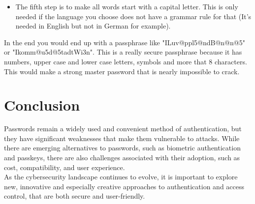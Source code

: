 \documentclass[conference]{IEEEtran}
\begin{document}
\begin{enumerate}
\begin{itemize}
\item The fifth step is to make all words start with a capital letter. This is only needed if the language you choose does not have a grammar rule for that (It's needed in English but not in German for example). 
\end{itemize}
In the end you would end up with a passphrase like "ILuv@ppl5@ndB@n@n@5" or "Ikomm@u5d@5tadtWi3n". This is a really secure passphrase because it has numbers, upper case and lower case letters, symbols and more that 8 characters. This would make a strong master password that is nearly impossible to crack.
\end{enumerate}


\section{Conclusion}
Passwords remain a widely used and convenient method of authentication, but they have significant weaknesses that make them vulnerable to attacks. While there are emerging alternatives to passwords, such as biometric authentication and passkeys, there are also challenges associated with their adoption, such as cost, compatibility, and user experience.\\
As the cybersecurity landscape continues to evolve, it is important to explore new, innovative and especially creative approaches to authentication and access control, that are both secure and user-friendly.


\listoffigures
\end{document}
